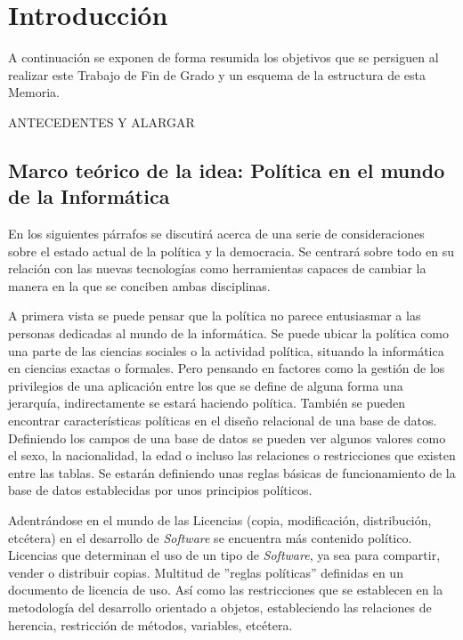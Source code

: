 \newpage
\thispagestyle{sectioned}
\chapter{Introducción}

A continuación se exponen de forma resumida los objetivos que se persiguen al realizar este Trabajo de Fin de Grado y un esquema de la estructura de esta Memoria.

ANTECEDENTES Y ALARGAR

\section{Marco teórico de la idea: Política en el mundo de la Informática}

En los siguientes párrafos se discutirá acerca de una serie de consideraciones sobre el estado actual de la política y la democracia. Se centrará sobre todo en su relación con las nuevas tecnologías como herramientas capaces de cambiar la manera en la que se conciben ambas disciplinas.

A primera vista se puede pensar que la política no parece entusiasmar a las personas dedicadas al mundo de la informática. Se puede ubicar la política como una parte de las ciencias sociales o la actividad política, situando la informática en ciencias exactas o formales. Pero pensando en factores como la gestión de los privilegios de una aplicación entre los que se define de alguna forma una jerarquía, indirectamente se estará haciendo política. También se pueden encontrar características políticas en el diseño relacional de una base de datos. Definiendo los campos de una base de datos se pueden ver algunos valores como el sexo, la nacionalidad, la edad o incluso las relaciones o restricciones que existen entre las tablas. Se estarán definiendo unas reglas básicas de funcionamiento de la base de datos establecidas por unos principios políticos.

Adentrándose en el mundo de las Licencias (copia, modificación, distribución, etcétera) en el desarrollo de \textit{Software} se encuentra más contenido político. Licencias que determinan el uso de un tipo de \textit{Software}, ya sea para compartir, vender o distribuir copias. Multitud de ''reglas políticas'' definidas en un documento de licencia de uso. Así como las restricciones que se establecen en la metodología del desarrollo orientado a objetos, estableciendo las relaciones de herencia, restricción de métodos, variables, etcétera.

